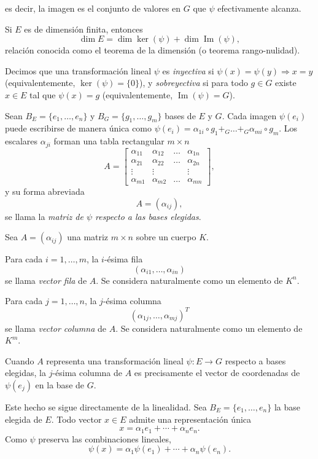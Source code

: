 es decir, la imagen es el conjunto de valores en $G$ que $\psi$ efectivamente alcanza.

\medskip

Si $E$ es de dimensión finita, entonces
\[
\dim E = \dim \ker(\psi) + \dim \operatorname{Im}(\psi),
\]
relación conocida como el teorema de la dimensión (o teorema rango-nulidad).

\medskip

Decimos que una transformación lineal $\psi$ es \emph{inyectiva} si $\psi(x)=\psi(y)\Rightarrow x=y$ (equivalentemente, $\ker(\psi)=\{0\}$), y \emph{sobreyectiva} si para todo $g\in G$ existe $x\in E$ tal que $\psi(x)=g$ (equivalentemente, $\operatorname{Im}(\psi)=G$).

\medskip

Sean $B_E=\{e_1,\dots,e_n\}$ y $B_G=\{g_1,\dots,g_m\}$ bases de $E$ y $G$. Cada imagen $\psi(e_i)$ puede escribirse de manera única como
\(
\psi(e_i) = \alpha_{1i} \circ g_1 +_G \dots +_G \alpha_{mi} \circ g_m.
\)
Los escalares $\alpha_{ji}$ forman una tabla rectangular $m\times n$
\[
A =
\begin{bmatrix}
\alpha_{11} & \alpha_{12} & \dots & \alpha_{1n} \\
\alpha_{21} & \alpha_{22} & \dots & \alpha_{2n} \\
\vdots & \vdots & & \vdots \\
\alpha_{m1} & \alpha_{m2} & \dots & \alpha_{mn}
\end{bmatrix},
\]
y su forma abreviada
\[
A=(\alpha_{ij}),
\]
se llama la \emph{matriz de $\psi$ respecto a las bases elegidas}.

\medskip

Sea $A=(\alpha_{ij})$ una matriz $m \times n$ sobre un cuerpo $K$.

Para cada $i=1,\dots,m$, la $i$-ésima fila
\[
(\alpha_{i1},\dots,\alpha_{in})
\]
se llama \textit{vector fila} de $A$.
Se considera naturalmente como un elemento de $K^n$.

Para cada $j=1,\dots,n$, la $j$-ésima columna
\[
(\alpha_{1j},\dots,\alpha_{mj})^T
\]
se llama \textit{vector columna} de $A$.
Se considera naturalmente como un elemento de $K^m$.

\medskip

Cuando $A$ representa una transformación lineal $\psi:E\to G$
respecto a bases elegidas,
la $j$-ésima columna de $A$ es precisamente el vector de coordenadas
de $\psi(e_j)$ en la base de $G$.

\medskip

Este hecho se sigue directamente de la linealidad.
Sea $B_E=\{e_1,\dots,e_n\}$ la base elegida de $E$.
Todo vector $x\in E$ admite una representación única
\[
x=\alpha_1 e_1+\cdots+\alpha_n e_n.
\]
Como $\psi$ preserva las combinaciones lineales,
\[
\psi(x)=\alpha_1\psi(e_1)+\cdots+\alpha_n\psi(e_n).
\]

